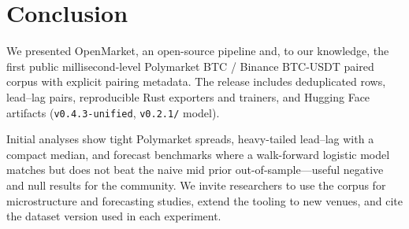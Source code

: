 \section{Conclusion}
\label{sec:conclusion}

We presented OpenMarket, an open-source pipeline and, to our knowledge, the
first public millisecond-level Polymarket BTC / Binance BTC-USDT paired corpus
with explicit pairing metadata. The release includes \OpenMarketTotalRows{}
deduplicated rows, \OpenMarketLagPairs{} lead--lag pairs, reproducible Rust
exporters and trainers, and Hugging Face artifacts
(\texttt{v0.4.3-unified}, \texttt{v0.2.1/} model).

Initial analyses show tight Polymarket spreads, heavy-tailed lead--lag with a
compact median, and forecast benchmarks where a walk-forward logistic model
matches but does not beat the naive mid prior out-of-sample---useful negative
and null results for the community. We invite researchers to use the corpus for microstructure and
forecasting studies, extend the tooling to new venues, and cite the dataset
version used in each experiment.
